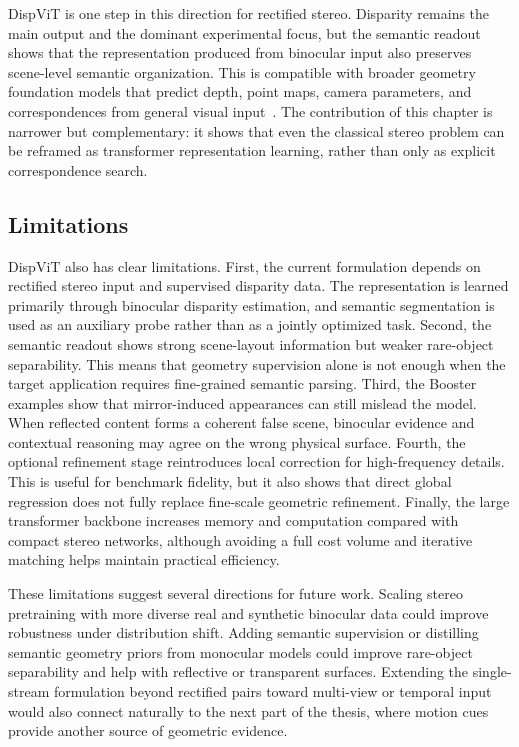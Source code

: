 DispViT is one step in this direction for rectified stereo.
Disparity remains the main output and the dominant experimental focus, but the semantic readout shows that the representation produced from binocular input also preserves scene-level semantic organization.
This is compatible with broader geometry foundation models that predict depth, point maps, camera parameters, and correspondences from general visual input~\cite{wang2025vggt}.
The contribution of this chapter is narrower but complementary: it shows that even the classical stereo problem can be reframed as transformer representation learning, rather than only as explicit correspondence search.

\subsection{Limitations}
DispViT also has clear limitations.
First, the current formulation depends on rectified stereo input and supervised disparity data.
The representation is learned primarily through binocular disparity estimation, and semantic segmentation is used as an auxiliary probe rather than as a jointly optimized task.
Second, the semantic readout shows strong scene-layout information but weaker rare-object separability.
This means that geometry supervision alone is not enough when the target application requires fine-grained semantic parsing.
Third, the Booster examples show that mirror-induced appearances can still mislead the model.
When reflected content forms a coherent false scene, binocular evidence and contextual reasoning may agree on the wrong physical surface.
Fourth, the optional refinement stage reintroduces local correction for high-frequency details.
This is useful for benchmark fidelity, but it also shows that direct global regression does not fully replace fine-scale geometric refinement.
Finally, the large transformer backbone increases memory and computation compared with compact stereo networks, although avoiding a full cost volume and iterative matching helps maintain practical efficiency.

These limitations suggest several directions for future work.
Scaling stereo pretraining with more diverse real and synthetic binocular data could improve robustness under distribution shift.
Adding semantic supervision or distilling semantic geometry priors from monocular models could improve rare-object separability and help with reflective or transparent surfaces.
Extending the single-stream formulation beyond rectified pairs toward multi-view or temporal input would also connect naturally to the next part of the thesis, where motion cues provide another source of geometric evidence.

